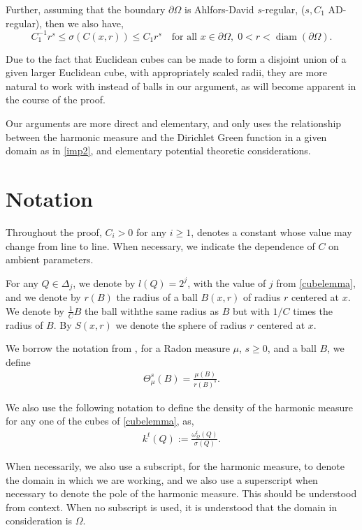 \documentclass{article}
\newcounter{lem}
\theoremstyle{plain}
\theoremstyle{plain}
\theoremstyle{definition}
\theoremstyle{plain}
\begin{document}
Further, assuming that the boundary $\partial\Omega$ is Ahlfors-David $s$-regular, ($s,C_1$ AD-regular), then we also have,
\begin{equation}\label{adr}\tag{2'}
C_{1}^{-1} r^{s} \le \sigma(C(x,r)) \le C_{1} r^{s}
\quad \text{for all } x \in \partial\Omega,\; 0 < r < \operatorname{diam}(\partial\Omega).
\end{equation}
 
Due to the fact that Euclidean cubes can be made to form a disjoint union of a given larger Euclidean cube, with appropriately scaled radii, they are more natural to work with instead of balls in our argument, as will become apparent in the course of the proof.


Our arguments are more direct and elementary, and only uses the relationship between the harmonic measure and the Dirichlet Green function in a given domain as in \cref{imp2}, and elementary potential theoretic considerations.

\section{Notation}

Throughout the proof, $C_i>0$ for any $i\geq 1$, denotes a constant whose value may change from line to line. 
When necessary, we indicate the dependence of $C$ on ambient parameters. 


For any $Q\in \Delta_j$, we denote by $l(Q)=2^j$, with the value of $j$ from \cref{cubelemma}, and we denote by $r(B)$ the radius of a ball $B(x,r)$ of radius $r$ centered at $x$. We denote by $\frac{1}{C}B$ the ball withthe same radius as $B$ but with $1/C$ times the radius of $B$. By $S(x,r)$ we denote the sphere of radius $r$ centered at $x$.


We borrow the notation from \cite{Az20}, for a Radon measure $\mu$, $s\geq 0$, and a ball $B$, we define
\begin{align}
\Theta_{\mu}^{s}(B)= \frac{\mu(B)}{r(B)^{s}}.
\end{align}

We also use the following notation to define the density of the harmonic measure for any one of the cubes of \cref{cubelemma}, as,
\begin{align}
    k^{t}(Q):=\frac{\omega^{t}_{\Omega}(Q)}{\sigma(Q)}.
\end{align}

When necessarily, we also use a subscript, for the harmonic measure, to denote the domain in which we are working, and we also use a superscript when necessary to denote the pole of the harmonic measure. This should be understood from context. When no subscript is used, it is understood that the domain in consideration is $\Omega$.
\end{document}

